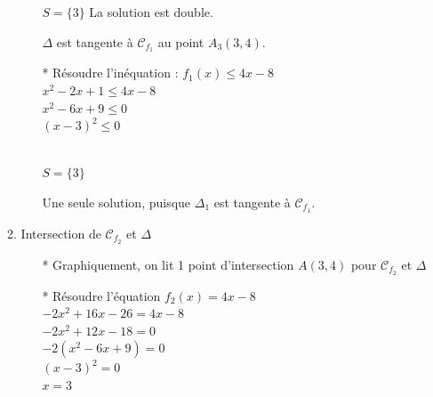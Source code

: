 \begin{enumerate}
\begin{enumerate}
\begin{itemize}
$S=\{3\}$ La solution est double. 
               
$\Delta$ est tangente à   $\mathcal{C}_{f_1}$ au point $A_3(3,4)$.

\item [*] Résoudre l'inéquation : $f_1(x) \leqslant 4x - 8$\\

$  x^2 -2x + 1 \leqslant 4x -8 $\\
$  x^2 -6x +9  \leqslant   0   $\\
$  (x - 3)^2   \leqslant   0   $  \\


 \\

$S = \{3\}$ 

Une seule solution, puisque  $\Delta_1$ est tangente à $\mathcal{C}_{f_1}$.

\end{itemize}

\item Intersection de $\mathcal{C}_{f_2}$ et $\Delta$ \\

\begin{itemize}
\item [*] Graphiquement, on lit 1 point d'intersection  $A(3, 4)$  pour $\mathcal{C}_{f_2}$ et $\Delta$\\ 

\item [*] Résoudre l'équation $f_2(x) = 4x - 8$\\

$  -2x^2 +16x -26 = 4x -8 $\\
$  -2x^2 +12x -18 = 0 $\\
$  -2(x^2 -6x +9) = 0 $\\
$  (x - 3)^2 = 0 $ \\
$ x = 3 $ \\


\end{itemize}
\end{enumerate}
\end{enumerate}
